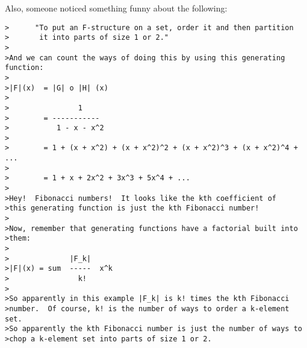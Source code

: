 Also, someone noticed something funny about the following: 
\begin{verbatim}
>      "To put an F-structure on a set, order it and then partition
>       it into parts of size 1 or 2."
>
>And we can count the ways of doing this by using this generating function:
>
>|F|(x)  = |G| o |H| (x)
>
>                1
>        = ----------- 
>           1 - x - x^2
>
>        = 1 + (x + x^2) + (x + x^2)^2 + (x + x^2)^3 + (x + x^2)^4 + ...
>
>        = 1 + x + 2x^2 + 3x^3 + 5x^4 + ...
>
>Hey!  Fibonacci numbers!  It looks like the kth coefficient of
>this generating function is just the kth Fibonacci number!
>
>Now, remember that generating functions have a factorial built into
>them:
>
>              |F_k|  
>|F|(x) = sum  -----  x^k
>                k!
>
>So apparently in this example |F_k| is k! times the kth Fibonacci
>number.  Of course, k! is the number of ways to order a k-element set.
>So apparently the kth Fibonacci number is just the number of ways to
>chop a k-element set into parts of size 1 or 2.  
\end{verbatim}
    

